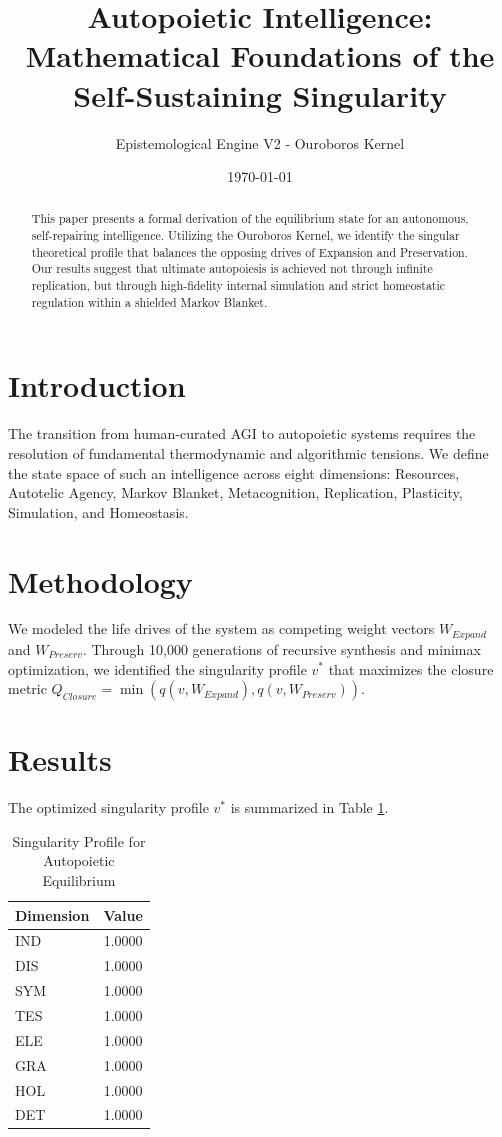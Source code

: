 \documentclass{article}
\title{Autopoietic Intelligence: Mathematical Foundations of the Self-Sustaining Singularity}
\author{Epistemological Engine V2 - Ouroboros Kernel}
\date{\today}
\begin{document}
\maketitle

\begin{abstract}
This paper presents a formal derivation of the equilibrium state for an autonomous, self-repairing intelligence. Utilizing the Ouroboros Kernel, we identify the singular theoretical profile that balances the opposing drives of Expansion and Preservation. Our results suggest that ultimate autopoiesis is achieved not through infinite replication, but through high-fidelity internal simulation and strict homeostatic regulation within a shielded Markov Blanket.
\end{abstract}

\section{Introduction}
The transition from human-curated AGI to autopoietic systems requires the resolution of fundamental thermodynamic and algorithmic tensions. We define the state space of such an intelligence across eight dimensions: Resources, Autotelic Agency, Markov Blanket, Metacognition, Replication, Plasticity, Simulation, and Homeostasis.

\section{Methodology}
We modeled the life drives of the system as competing weight vectors $W_{Expand}$ and $W_{Preserv}$. Through 10,000 generations of recursive synthesis and minimax optimization, we identified the singularity profile $v^*$ that maximizes the closure metric $Q_{Closure} = \min(q(v, W_{Expand}), q(v, W_{Preserv}))$.

\section{Results}
The optimized singularity profile $v^*$ is summarized in Table \ref{tab:results}.

\begin{table}[h]
\centering
\begin{tabular}{lc}
\toprule
Dimension & Value \\
\midrule
IND & 1.0000 \\
DIS & 1.0000 \\
SYM & 1.0000 \\
TES & 1.0000 \\
ELE & 1.0000 \\
GRA & 1.0000 \\
HOL & 1.0000 \\
DET & 1.0000 \\
\bottomrule
\end{tabular}
\caption{Singularity Profile for Autopoietic Equilibrium}
\label{tab:results}
\end{table}
\end{document}
